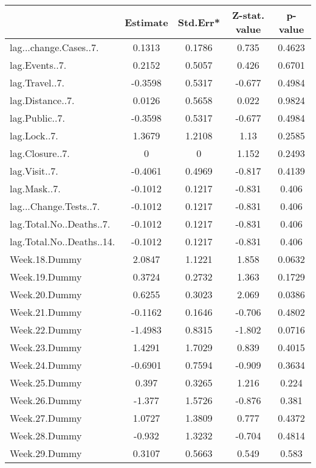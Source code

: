 \begingroup\tiny
\begin{longtable}{lcccc}
  \toprule
 & Estimate & Std.Err* & Z-stat. value & p-value \\ 
  \midrule
lag...change.Cases..7. & 0.1313 & 0.1786 & 0.735 & 0.4623 \\ 
  lag.Events..7. & 0.2152 & 0.5057 & 0.426 & 0.6701 \\ 
  lag.Travel..7. & -0.3598 & 0.5317 & -0.677 & 0.4984 \\ 
  lag.Distance..7. & 0.0126 & 0.5658 & 0.022 & 0.9824 \\ 
  lag.Public..7. & -0.3598 & 0.5317 & -0.677 & 0.4984 \\ 
  lag.Lock..7. & 1.3679 & 1.2108 & 1.13 & 0.2585 \\ 
  lag.Closure..7. & 0 & 0 & 1.152 & 0.2493 \\ 
  lag.Visit..7. & -0.4061 & 0.4969 & -0.817 & 0.4139 \\ 
  lag.Mask..7. & -0.1012 & 0.1217 & -0.831 & 0.406 \\ 
  lag...Change.Tests..7. & -0.1012 & 0.1217 & -0.831 & 0.406 \\ 
  lag.Total.No..Deaths..7. & -0.1012 & 0.1217 & -0.831 & 0.406 \\ 
  lag.Total.No..Deaths..14. & -0.1012 & 0.1217 & -0.831 & 0.406 \\ 
  Week.18.Dummy & 2.0847 & 1.1221 & 1.858 & 0.0632 \\ 
  Week.19.Dummy & 0.3724 & 0.2732 & 1.363 & 0.1729 \\ 
  Week.20.Dummy & 0.6255 & 0.3023 & 2.069 & 0.0386 \\ 
  Week.21.Dummy & -0.1162 & 0.1646 & -0.706 & 0.4802 \\ 
  Week.22.Dummy & -1.4983 & 0.8315 & -1.802 & 0.0716 \\ 
  Week.23.Dummy & 1.4291 & 1.7029 & 0.839 & 0.4015 \\ 
  Week.24.Dummy & -0.6901 & 0.7594 & -0.909 & 0.3634 \\ 
  Week.25.Dummy & 0.397 & 0.3265 & 1.216 & 0.224 \\ 
  Week.26.Dummy & -1.377 & 1.5726 & -0.876 & 0.381 \\ 
  Week.27.Dummy & 1.0727 & 1.3809 & 0.777 & 0.4372 \\ 
  Week.28.Dummy & -0.932 & 1.3232 & -0.704 & 0.4814 \\ 
  Week.29.Dummy & 0.3107 & 0.5663 & 0.549 & 0.583 \\ 

\end{longtable}

